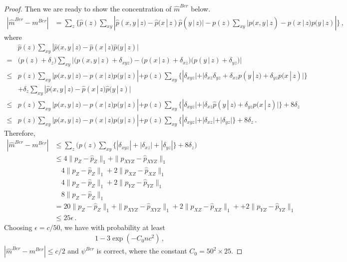 \documentclass{article}
\theoremstyle{definition}
\theoremstyle{definition}
\theoremstyle{definition}
\theoremstyle{definition}
\theoremstyle{definition}
\theoremstyle{definition}
\theoremstyle{remark}
\theoremstyle{remark}
\newcommand{\given}{\,|\,}
\newcommand{\dpdm}{m}
\begin{document}
\begin{proof}
Then we are ready to show the concentration of $\widehat{\dpdm}^{Ber}$ below.
\begin{align*}
    |\widehat{\dpdm}^{Ber} - \dpdm^{Ber}| & = \sum_z \bigg\{\widehat{p}(z)\sum_{xy}|\widehat{p}(x,y\given z) - \widehat{p}(x\given z) \widehat{p}(y\given z)| - p(z)\sum_{xy}|p(x,y\given z) - p(x\given z) p(y\given z)|\bigg\}\,,
\end{align*}
where 
\begin{align*}
    & \widehat{p}(z)\sum_{xy}|\widehat{p}(x,y\given z) - \widehat{p}(x\given z) \widehat{p}(y\given z)| \\
    =& \Big(p(z) +\delta_z\Big)\sum_{xy}\Big|\Big(p(x,y\given z)+\delta_{xyz}\Big) - \Big(p(x\given z) + \delta_{xz}\Big)\Big( p(y\given z) + \delta_{yz}\Big)\Big| \\
    \le & p(z)\sum_{xy}|p(x,y\given z) - p(x\given z) p(y\given z)| + p(z)\sum_{xy}\Big\{|\delta_{xyz}| + |\delta_{xz}\delta_{yz} + \delta_{xz}p(y\given z) + \delta_{yz}p(x\given z)|\Big\} \\
    & + \delta_z \sum_{xy}|\widehat{p}(x,y\given z) - \widehat{p}(x\given z) \widehat{p}(y\given z)| \\
    \le & p(z)\sum_{xy}|p(x,y\given z) - p(x\given z) p(y\given z)| + p(z)\sum_{xy}\Big\{ |\delta_{xyz}| + |\delta_{xz}\widehat{p}(y\given z) + \delta_{yz}p(x\given z)|\Big\} + 8\delta_z \\
    \le & p(z)\sum_{xy}|p(x,y\given z) - p(x\given z) p(y\given z)| + p(z)\sum_{xy}\Big\{ |\delta_{xyz}| + |\delta_{xz}| + |\delta_{yz}|\Big\} + 8\delta_z \,.
\end{align*}
Therefore,
\begin{align*}
    |\widehat{\dpdm}^{Ber} - \dpdm^{Ber}| & \le \sum_z \bigg(p(z)\sum_{xy}\Big\{ |\delta_{xyz}| + |\delta_{xz}| + |\delta_{yz}|\Big\} + 8\delta_z \bigg)\\
    & \le 4 \|p_Z-\widehat{p}_Z\|_1 + \|p_{XYZ}-\widehat{p}_{XYZ}\|_1 \\
    & \quad 4 \|p_Z-\widehat{p}_Z\|_1 + 2\|p_{XZ}-\widehat{p}_{XZ}\|_1 \\
    & \quad 4 \|p_Z-\widehat{p}_Z\|_1 + 2\|p_{YZ}-\widehat{p}_{YZ}\|_1 \\
    & \quad 8\|p_Z-\widehat{p}_Z\|_1 \\
    & = 20 \|p_Z-\widehat{p}_Z\|_1 + \|p_{XYZ}-\widehat{p}_{XYZ}\|_1 + 2\|p_{XZ}-\widehat{p}_{XZ}\|_1 +  + 2\|p_{YZ}-\widehat{p}_{YZ}\|_1 \\
    & \le 25\epsilon\,.
\end{align*}
Choosing $\epsilon = c/50$, we have with probability at least
\begin{align*}
    1 - 3\exp(-C_0 nc^2)\,,
\end{align*}
$|\widehat{\dpdm}^{Ber} - \dpdm^{Ber}|\le c/2 $ and $\psi^{Ber}$ is correct, where the constant $C_0=50^2\times 25$.
\end{proof}
\end{document}
